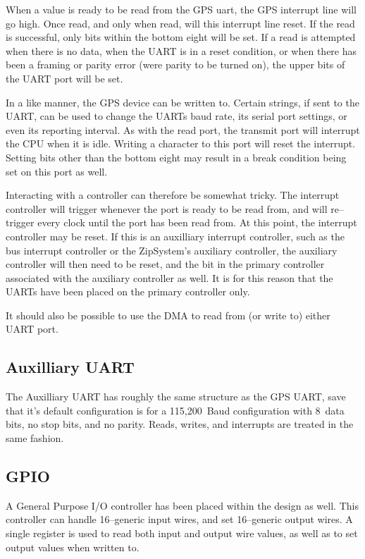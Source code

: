\documentclass{gqtekspec}
\begin{document}
When a value is ready to be read from the GPS uart, the GPS interrupt line
will go high.  Once read, and only when read, will this interrupt line reset.
If the read is successful, only bits within the bottom eight will be set.
If a read is attempted when there is no data, when the UART is in a reset
condition, or when there has been a framing or parity error (were parity
to be turned on), the upper bits of the UART port will be set.

In a like manner, the GPS device can be written to.  Certain strings, if sent
to the UART, can be used to change the UARTs baud rate, its serial port
settings, or even its reporting interval.  As with the read port, the transmit
port will interrupt the CPU when it is idle.  Writing a character to this
port will reset the interrupt.  Setting bits other than the bottom eight may
result in a break condition being set on this port as well.

Interacting with a controller can therefore be somewhat tricky.  The
interrupt controller will trigger whenever the port is ready to be read from,
and will re--trigger every clock until the port has been read from.  At this
point, the interrupt controller may be reset.  If this is an auxilliary
interrupt controller, such as the bus interrupt controller or the ZipSystem's
auxiliary controller, the auxiliary controller will then need to be reset,
and the bit in the primary controller associated with the auxiliary controller
as well.  It is for this reason that the UARTs have been placed on the
primary controller only.

It should also be possible to use the DMA to read from (or write to) either
UART port.

\subsection{Auxilliary UART}

The Auxilliary UART has roughly the same structure as the GPS UART, save that
it's default configuration is for a 115,200~Baud configuration with 8~data bits,
no stop bits, and no parity.  Reads, writes, and interrupts are treated in
the same fashion.

\subsection{GPIO}

A General Purpose I/O controller has been placed within the design as well.
This controller can handle 16--generic input wires, and set 16--generic output
wires.  A single register is used to read both input and output wire values,
as well as to set output values when written to. 
\end{document}
